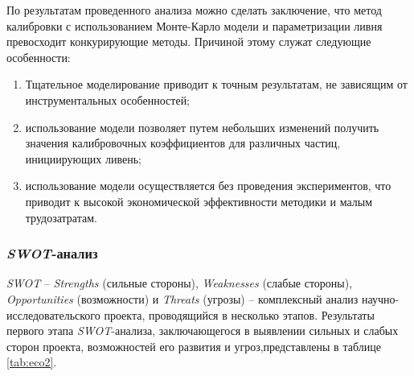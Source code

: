 По результатам проведенного анализа можно сделать заключение, что метод калибровки с использованием Монте-Карло модели и параметризации ливня  превосходит  конкурирующие  методы.  Причиной  этому  служат следующие особенности:

\begin{enumerate}[wide]
\item Тщательное моделирование приводит к точным результатам, не зависящим от инструментальных особенностей;
\item использование  модели  позволяет  путем  небольших  изменений получить  значения  калибровочных  коэффициентов  для  различных  частиц, инициирующих ливень;
\item использование   модели   осуществляется   без   проведения экспериментов,  что  приводит  к  высокой  экономической  эффективности методики и малым трудозатратам.
\end{enumerate}

\subsubsection{\textit{SWOT}-анализ} \label{eco.1.3}

\textit{SWOT} – \textit{Strengths} (сильные стороны), \textit{Weaknesses} (слабые стороны), \textit{Opportunities} (возможности)  и \textit{Threats}  (угрозы) -- комплексный  анализ научно-исследовательского проекта, проводящийся в несколько этапов. Результаты   первого   этапа \textit{SWOT}-анализа,   заключающегося   в выявлении сильных и слабых сторон проекта, возможностей его развития и угроз,представлены в таблице \ref{tab:eco2}.

